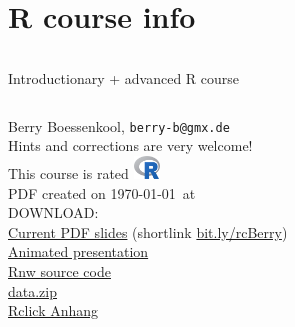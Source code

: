 \documentclass[xcolor=table,       handout,    xcolor=dvipsnames]{beamer}\usepackage[]{graphicx}\usepackage[]{color}
\begin{document}






\section{R course info}



{
\begin{frame}
\begin{center}
    \begin{columns}
    \column{20.2em}
    \begin{block}{}{\Large Introductionary + advanced R course}
    \end{block}
    \end{columns}
\vspace{1em}
Berry Boessenkool, \texttt{berry-b@gmx.de}\\
Hints and corrections are very welcome!\\[1em]
This course is rated \includegraphics[width=0.7cm]{externalfig/Rlogo.png}\\[1em]
\scriptsize
PDF created on \today\ at \currenttime\ \\[1em]
DOWNLOAD:\\
\href{https://dl.dropboxusercontent.com/u/4836866/R_course_Berry/RcourseBerry.pdf?dl=1}{Current PDF slides} (shortlink \href{http://bit.ly/rcBerry}{bit.ly/rcBerry})\\
\href{https://dl.dropboxusercontent.com/u/4836866/R_course_Berry/RcourseBerry pres.pdf}{Animated presentation}\\
\href{https://dl.dropboxusercontent.com/u/4836866/R_course_Berry/RcourseBerry_dev.Rnw}{Rnw source code}\\
\href{https://dl.dropboxusercontent.com/u/4836866/R_course_Berry/data.zip}{data.zip}\\[1em]
\href{https://dl.dropboxusercontent.com/u/4836866/Rclick/Anhang.pdf}{Rclick Anhang}
\end{center}
\end{frame}
}
\end{document}
